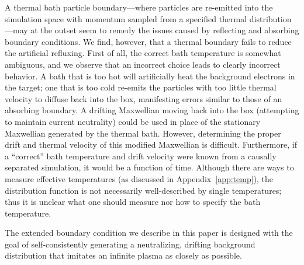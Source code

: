 \documentclass[../absorber.tex]{subfiles}
\begin{document}
A thermal bath particle boundary---where particles are re-emitted into the simulation space with momentum sampled from a specified thermal distribution---may at the outset seem to remedy the issues caused by reflecting and absorbing boundary conditions. We find, however, that a thermal boundary fails to reduce the artificial refluxing. First of all, the correct bath temperature is somewhat ambiguous, and we observe that an incorrect choice leads to clearly incorrect behavior. A bath that is too hot will artificially heat the background electrons in the target; one that is too cold re-emits the particles with too little thermal velocity to diffuse back into the box, manifesting errors similar to those of an absorbing boundary. A drifting Maxwellian moving back into the box (attempting to maintain current neutrality) could be used in place of the stationary Maxwellian generated by the thermal bath. However, determining the proper drift and thermal velocity of this modified Maxwellian is difficult. Furthermore, if a ``correct'' bath temperature and drift velocity were known from a causally separated simulation, it would be a function of time.  Although there are ways to measure effective temperatures (as discussed in Appendix~\ref{app:temp}), the distribution function is not necessarily well-described by single temperatures; thus it is unclear what one should measure nor how to specify the bath temperature.


The extended boundary condition we describe in this paper is designed with the goal of self-consistently generating a neutralizing, drifting background distribution that imitates an infinite plasma as closely as possible.
\end{document}
